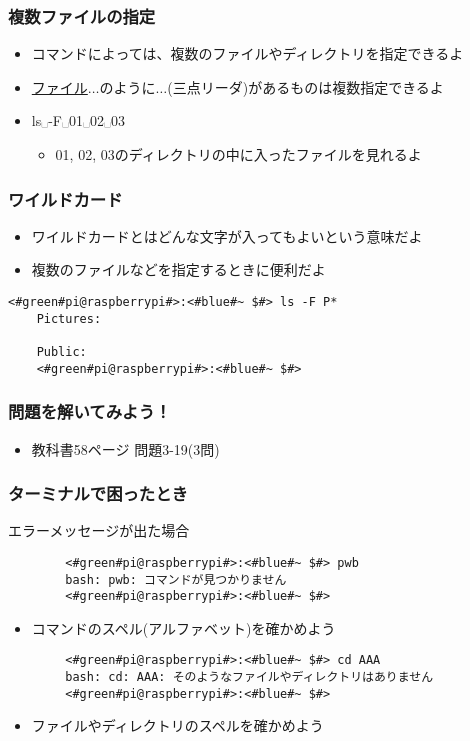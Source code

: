 \begin{frame}
    \frametitle{複数ファイルの指定}
    \begin{itemize}
        \item コマンドによっては、複数のファイルやディレクトリを指定できるよ
        \item \underline{ファイル}$\ldots$のように$\ldots$(三点リーダ)があるものは複数指定できるよ
        \item ls␣-F␣01␣02␣03
        \begin{itemize}
            \item 01, 02, 03のディレクトリの中に入ったファイルを見れるよ
        \end{itemize}
    \end{itemize}
\end{frame}

\begin{frame}[fragile]
    \frametitle{ワイルドカード}
    \begin{itemize}
        \item ワイルドカードとはどんな文字が入ってもよいという意味だよ
        \item 複数のファイルなどを指定するときに便利だよ
    \end{itemize}
    \begin{lstlisting}[title=ワイルドカードの使い方の例]
    <#green#pi@raspberrypi#>:<#blue#~ $#> ls -F P*
    Pictures:
            
    Public:
    <#green#pi@raspberrypi#>:<#blue#~ $#>
    \end{lstlisting}
\end{frame}

\begin{frame}
    \frametitle{問題を解いてみよう！}
    \begin{itemize}
        \item 教科書58ページ 問題3-19(3問)
    \end{itemize}
\end{frame}

\begin{frame}[fragile]
    \frametitle{ターミナルで困ったとき}
    エラーメッセージが出た場合
    \begin{lstlisting}
        <#green#pi@raspberrypi#>:<#blue#~ $#> pwb
        bash: pwb: コマンドが見つかりません
        <#green#pi@raspberrypi#>:<#blue#~ $#> 
        \end{lstlisting}
    \begin{itemize}
        \item コマンドのスペル(アルファベット)を確かめよう
    \end{itemize}
    \begin{lstlisting}
        <#green#pi@raspberrypi#>:<#blue#~ $#> cd AAA
        bash: cd: AAA: そのようなファイルやディレクトリはありません
        <#green#pi@raspberrypi#>:<#blue#~ $#> 
        \end{lstlisting}
    \begin{itemize}
        \item ファイルやディレクトリのスペルを確かめよう
    \end{itemize}
\end{frame}

